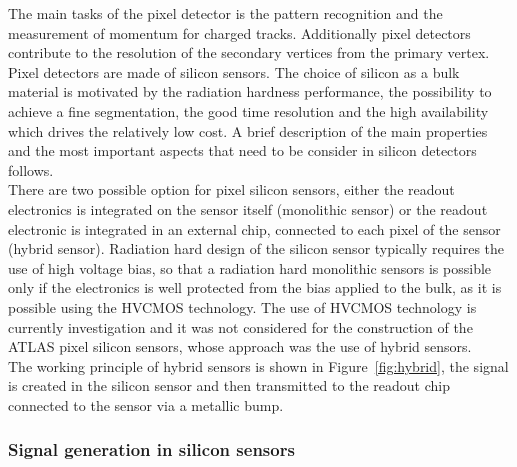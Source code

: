 The main tasks of the pixel detector is the pattern recognition and the measurement of momentum for charged tracks. Additionally pixel detectors contribute to the resolution of the secondary vertices from the primary vertex. Pixel detectors are made of silicon sensors. The choice of silicon as a bulk material is motivated by the radiation hardness performance, the possibility to achieve a fine segmentation, the good time resolution and the high availability which drives the relatively low cost.
A brief description of the main properties and the most important aspects that need to be consider in silicon detectors follows.\\
There are two possible option for pixel silicon sensors, either the readout electronics is integrated on the sensor itself (monolithic sensor) or the readout electronic is integrated in an external chip, connected to each pixel of the sensor (hybrid sensor). Radiation hard design of the silicon sensor typically requires the use of high voltage bias, so that a radiation hard monolithic sensors is possible only if the electronics is well protected from the bias applied to the bulk, as it is possible using the HVCMOS technology. The use of HVCMOS technology is currently investigation and it was not considered for the construction of the ATLAS pixel silicon sensors, whose approach was the use of hybrid sensors.\\
The working principle of hybrid sensors is shown in Figure~\ref{fig:hybrid}, the signal is created in the silicon sensor and then transmitted to the readout chip connected to the sensor via a metallic bump.

\subsubsection{Signal generation in silicon sensors}


